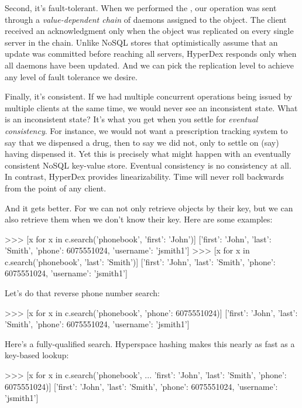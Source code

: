 Second, it's fault-tolerant. When we performed the , our operation was
sent through a {\em value-dependent chain} of daemons assigned to the object.
The client received an acknowledgment only when the object was replicated on
every single server in the chain.  Unlike NoSQL stores that optimistically
assume that an update was committed before reaching all servers, HyperDex
responds only when all daemons have been updated.  And we can pick the
replication level to achieve any level of fault tolerance we desire.

Finally, it's consistent. If we had multiple concurrent  operations
being issued by multiple clients at the same time, we would never see an
inconsistent state.  What is an inconsistent state?  It's what you get when you
settle for {\em eventual consistency}.  For instance, we would not want a
prescription tracking system to say that we dispensed a drug, then to say we did
not, only to settle on (say) having dispensed it. Yet this is precisely what
might happen with an eventually consistent NoSQL key-value store.  Eventual
consistency is no consistency at all.  In contrast, HyperDex provides
linearizability. Time will never roll backwards from the point of any client.

And it gets better. For we can not only retrieve objects by their key, but we
can also retrieve them when we don't know their key. Here are some examples:

\begin{pythoncode}
>>> [x for x in c.search('phonebook', {'first': 'John'})]
[{'first': 'John',
  'last': 'Smith',
  'phone': 6075551024,
  'username': 'jsmith1'}]
>>> [x for x in c.search('phonebook', {'last': 'Smith'})]
[{'first': 'John',
  'last': 'Smith',
  'phone': 6075551024,
  'username': 'jsmith1'}]
\end{pythoncode}

Let's do that reverse phone number search:

\begin{pythoncode}
>>> [x for x in c.search('phonebook', {'phone': 6075551024})]
[{'first': 'John',
  'last': 'Smith',
  'phone': 6075551024,
  'username': 'jsmith1'}]
\end{pythoncode}

Here's a fully-qualified search. Hyperspace hashing makes this nearly as fast as
a key-based lookup:

\begin{pythoncode}
>>> [x for x in c.search('phonebook',
...  {'first': 'John', 'last': 'Smith', 'phone': 6075551024})]
[{'first': 'John',
  'last': 'Smith',
  'phone': 6075551024,
  'username': 'jsmith1'}]
\end{pythoncode}

